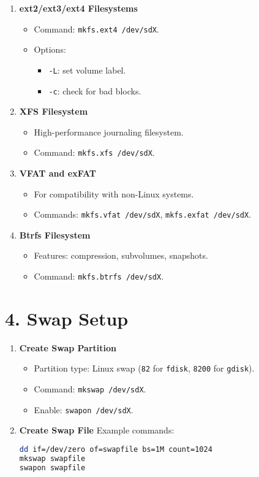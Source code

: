 \documentclass[a4paper]{report}
\begin{document}
\begin{enumerate}

    \item\textbf{ext2/ext3/ext4 Filesystems}
\begin{itemize}
    \item Command: \texttt{mkfs.ext4 /dev/sdX}.
    \item Options:
    \begin{itemize}
        \item \texttt{-L}: set volume label.
        \item \texttt{-c}: check for bad blocks.
    \end{itemize}
\end{itemize}

\item\textbf{XFS Filesystem}
\begin{itemize}
    \item High-performance journaling filesystem.
    \item Command: \texttt{mkfs.xfs /dev/sdX}.
\end{itemize}

\item\textbf{VFAT and exFAT}
\begin{itemize}
    \item For compatibility with non-Linux systems.
    \item Commands: \texttt{mkfs.vfat /dev/sdX}, \texttt{mkfs.exfat /dev/sdX}.
\end{itemize}

\item\textbf{Btrfs Filesystem}
\begin{itemize}
    \item Features: compression, subvolumes, snapshots.
    \item Command: \texttt{mkfs.btrfs /dev/sdX}.
\end{itemize}
\end{enumerate}

\section*{4. Swap Setup}
\begin{enumerate}
    \item\textbf{Create Swap Partition}
\begin{itemize}
    \item Partition type: Linux swap (\texttt{82} for \texttt{fdisk}, \texttt{8200} for \texttt{gdisk}).
    \item Command: \texttt{mkswap /dev/sdX}.
    \item Enable: \texttt{swapon /dev/sdX}.
\end{itemize}

\item\textbf{Create Swap File}
Example commands:
\begin{lstlisting}[language=bash]
dd if=/dev/zero of=swapfile bs=1M count=1024
mkswap swapfile
swapon swapfile
\end{lstlisting}
\end{enumerate}
\end{document}
